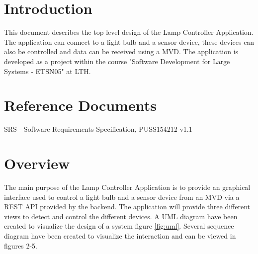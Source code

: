 \documentclass[a4paper]{article}
\begin{document}
	
	\tableofcontents
	\newpage
	
	\section{Introduction}
	This document describes the top level design of the Lamp Controller Application. The application can connect to a light bulb and a sensor device, these devices can also be controlled and data can be received using a MVD. The application is developed as a project within the course "Software Development for Large Systems - ETSN05" at LTH.
	
	\section{Reference Documents}
	SRS - Software Requirements Specification, PUSS154212 v1.1
	
	
	\section{Overview}
	The main purpose of the Lamp Controller Application is to provide an graphical interface used to control a light bulb and a sensor device from an MVD via a REST API provided by the backend. The application will provide three different views to detect and control the different devices. A UML diagram have been created to visualize the design of a system figure \ref{fig:uml}. Several sequence diagram have been created to visualize the interaction and can be viewed in figures 2-5.
	
\end{document}
